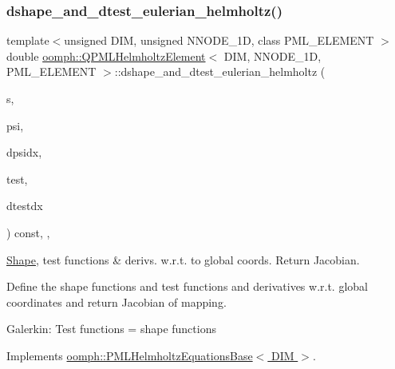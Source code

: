\mbox{\label{classoomph_1_1QPMLHelmholtzElement_a0d5e590e5bd51ba8d2331c6fdced4653}} 
\subsubsection{\texorpdfstring{dshape\+\_\+and\+\_\+dtest\+\_\+eulerian\+\_\+helmholtz()}{dshape\_and\_dtest\_eulerian\_helmholtz()}}
{\footnotesize\ttfamily template$<$unsigned D\+IM, unsigned N\+N\+O\+D\+E\+\_\+1D, class P\+M\+L\+\_\+\+E\+L\+E\+M\+E\+NT $>$ \\
double \hyperlink{classoomph_1_1QPMLHelmholtzElement}{oomph\+::\+Q\+P\+M\+L\+Helmholtz\+Element}$<$ D\+IM, N\+N\+O\+D\+E\+\_\+1D, P\+M\+L\+\_\+\+E\+L\+E\+M\+E\+NT $>$\+::dshape\+\_\+and\+\_\+dtest\+\_\+eulerian\+\_\+helmholtz (\begin{DoxyParamCaption}\item[{const \hyperlink{classoomph_1_1Vector}{Vector}$<$ double $>$ \&}]{s,  }\item[{\hyperlink{classoomph_1_1Shape}{Shape} \&}]{psi,  }\item[{\hyperlink{classoomph_1_1DShape}{D\+Shape} \&}]{dpsidx,  }\item[{\hyperlink{classoomph_1_1Shape}{Shape} \&}]{test,  }\item[{\hyperlink{classoomph_1_1DShape}{D\+Shape} \&}]{dtestdx }\end{DoxyParamCaption}) const\hspace{0.3cm}{\ttfamily [inline]}, {\ttfamily [protected]}, {\ttfamily [virtual]}}



\hyperlink{classoomph_1_1Shape}{Shape}, test functions \& derivs. w.\+r.\+t. to global coords. Return Jacobian. 

Define the shape functions and test functions and derivatives w.\+r.\+t. global coordinates and return Jacobian of mapping.

Galerkin\+: Test functions = shape functions 

Implements \hyperlink{classoomph_1_1PMLHelmholtzEquationsBase_ad8b68169a39c90b30fb4340ce654a350}{oomph\+::\+P\+M\+L\+Helmholtz\+Equations\+Base$<$ D\+I\+M $>$}.



